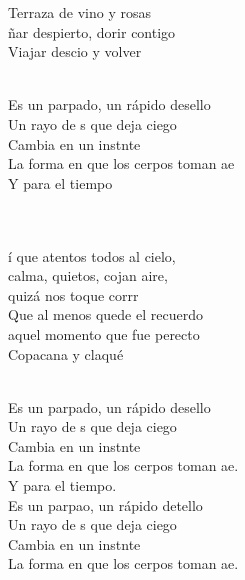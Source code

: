 \documentclass[12pt]{article}
\begin{document}
\begin{multicols*}{2}
\begin{cancion}
        Terraza de vino y rosas\\
                ñar despierto, dorir contigo\\
                Viajar descio y volver\\\jump\\
                \begin{chorus}%
                Es un parpado, un rápido desello\\
                Un rayo de s que deja ciego\\
                Cambia en un instnte\\
                La forma en que los cerpos toman ae\\
        Y para el tiempo\\
                \end{chorus}%
                \jump\\
                \chord{}{(}{ }                  \chord{}{)}{ }\\
                í que atentos todos al cielo, \\
        calma, quietos, cojan aire, \\
                quizá nos toque corrr\\
        Que al menos quede el recuerdo\\
                 aquel momento que fue perecto\\
                Copacana y claqué\\
        \jump
                \chord{}{(}{ }    \chord{}{)}{ }\\
                \begin{chorus}
                Es un parpado, un rápido desello\\
                Un rayo de s que deja ciego\\
                Cambia en un instnte\\
                La forma en que los cerpos toman ae.\\
        Y para el tiempo.\\
        \jump
                Es un parpao, un rápido detello\\
                Un rayo de s que deja ciego\\
                Cambia en un instnte\\
                La forma en que los cerpos toman ae.\\
                \end{chorus}%
                \jump\\
        \end{cancion}%
        

\end{multicols*}
\end{document}
